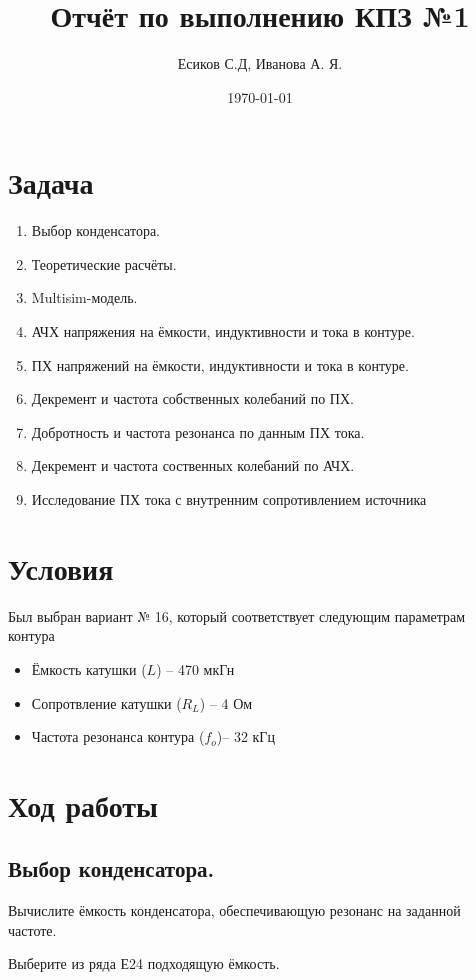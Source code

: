 \documentclass[12pt,a4paper]{article}
\title{Отчёт по выполнению КПЗ №1}
\author{Есиков С.Д, Иванова А. Я.}
\date{\today}
\begin{document}
	\maketitle
	\section{Задача}
	\begin{enumerate}
		\item Выбор конденсатора.
		\item Теоретические расчёты.
		\item Multisim-модель.
		\item АЧХ напряжения на ёмкости, индуктивности и тока в контуре.
		\item ПХ напряжений на ёмкости, индуктивности и тока в контуре.
		\item Декремент и частота собственных колебаний по ПХ.
		\item Добротность и частота резонанса по данным ПХ тока.
		\item Декремент и частота соственных колебаний по АЧХ.
		\item Исследование ПХ тока с внутренним сопротивлением источника
	\end{enumerate}
	\section{Условия}
	Был выбран вариант № 16, который соответствует следующим параметрам контура
	\begin{itemize}
		\item Ёмкость катушки ($L$) -- 470 мкГн
		\item Сопротвление катушки ($R_L$) -- 4 Ом
		\item Частота резонанса контура ($f_o$)-- 32 кГц
	\end{itemize}
	\newpage
	\section{Ход работы}
		\subsection{Выбор конденсатора.\newline}
		
			Вычислите ёмкость конденсатора, обеспечивающую резонанс на заданной частоте. 
			
			Выберите из ряда Е24 подходящую ёмкость.
			
\end{document}
